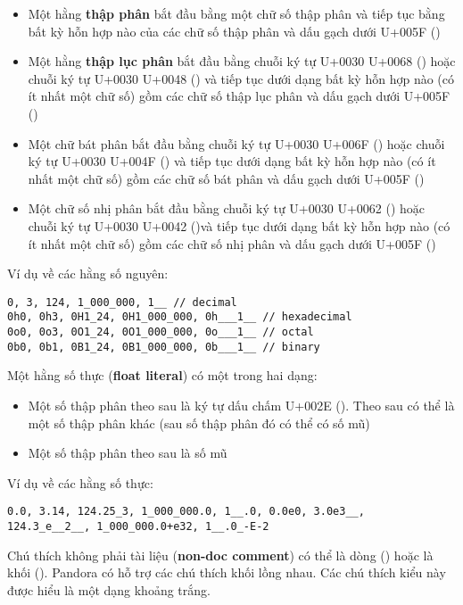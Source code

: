     \begin{itemize}
        \item{Một hằng \textbf{thập phân} bắt đầu bằng một chữ số thập phân và tiếp tục bằng bất kỳ hỗn hợp nào của các chữ số thập phân và dấu gạch dưới U+005F (\kw{\_})}
        \item{Một hằng \textbf{thập lục phân} bắt đầu bằng chuỗi ký tự U+0030 U+0068 () hoặc chuỗi ký tự U+0030 U+0048 () và tiếp tục dưới dạng bất kỳ hỗn hợp nào (có ít nhất một chữ số) gồm các chữ số thập lục phân và dấu gạch dưới U+005F (\kw{\_})}
        \item{Một chữ bát phân bắt đầu bằng chuỗi ký tự U+0030 U+006F () hoặc chuỗi ký tự U+0030 U+004F () và tiếp tục dưới dạng bất kỳ hỗn hợp nào (có ít nhất một chữ số) gồm các chữ số bát phân và dấu gạch dưới U+005F (\kw{\_})}
        \item{Một chữ số nhị phân bắt đầu bằng chuỗi ký tự U+0030 U+0062 () hoặc chuỗi ký tự U+0030 U+0042 ()và tiếp tục dưới dạng bất kỳ hỗn hợp nào (có ít nhất một chữ số) gồm các chữ số nhị phân và dấu gạch dưới U+005F (\kw{\_})}
    \end{itemize}

    \regexintegerliteral

\noindent Ví dụ về các hằng số nguyên:
\begin{lstlisting}[]
0, 3, 124, 1_000_000, 1__ // decimal
0h0, 0h3, 0H1_24, 0H1_000_000, 0h___1__ // hexadecimal
0o0, 0o3, 0O1_24, 0O1_000_000, 0o___1__ // octal
0b0, 0b1, 0B1_24, 0B1_000_000, 0b___1__ // binary
\end{lstlisting}

    Một hằng số thực (\textbf{float literal}) có một trong hai dạng:
    \begin{itemize}
        \item{Một số thập phân theo sau là ký tự dấu chấm U+002E (). Theo sau có thể là một số thập phân khác (sau số thập phân đó có thể có số mũ)}
        \item{Một số thập phân theo sau là số mũ}
    \end{itemize}

    \regexfloatliteral
    
\noindent Ví dụ về các hằng số thực:
\begin{lstlisting}[]
0.0, 3.14, 124.25_3, 1_000_000.0, 1__.0, 0.0e0, 3.0e3__, 
124.3_e__2__, 1_000_000.0+e32, 1__.0_-E-2
\end{lstlisting}

    Chú thích không phải tài liệu (\textbf{non-doc comment}) có thể là dòng (\kw{//}) hoặc là khối (). Pandora có hỗ trợ các chú thích khối lồng nhau. Các chú thích kiểu này được hiểu là một dạng khoảng trắng.

